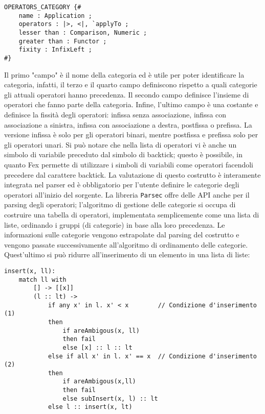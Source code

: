 \documentclass[10pt,a4paper]{article}
\begin{document}
\begin{lstlisting}
OPERATORS_CATEGORY {#
    name : Application ;
    operators : |>, <|, `applyTo ;
    lesser than : Comparison, Numeric ;
    greater than : Functor ;
    fixity : InfixLeft ;
#}
\end{lstlisting}

Il primo "campo" è il nome della categoria ed è utile per poter identificare la categoria, infatti, il terzo e il
quarto campo definiscono rispetto a quali categorie gli attuali operatori hanno precedenza. Il secondo campo definisce
l'insieme di operatori che fanno parte della categoria. Infine, l'ultimo campo è una costante e definisce la fissità
degli operatori: infissa senza associazione, infissa con associazione a sinistra, infissa con associazione a destra,
postfissa o prefissa. La versione infissa è solo per gli operatori binari, mentre postfissa e prefissa solo per gli
operatori unari. Si può notare che nella lista di operatori vi è anche un simbolo di variabile preceduto dal simbolo
di backtick; questo è possibile, in quanto Fex permette di utilizzare i simboli di variabili come operatori
facendoli precedere dal carattere backtick. La valutazione di questo costrutto è interamente integrata nel parser ed
è obbligatorio per l'utente definire le categorie degli operatori all'inizio del sorgente. La libreria \texttt{Parsec}
offre delle API anche per il parsing degli operatori; l'algoritmo di gestione delle categorie si occupa di costruire
una tabella di operatori, implementata semplicemente come una lista di liste, ordinando i gruppi (di categorie) in
base alla loro precedenza. Le informazioni sulle categorie vengono estrapolate dal parsing del costrutto e vengono
passate successivamente all'algoritmo di ordinamento delle categorie. Quest'ultimo si può ridurre all'inserimento
di un elemento in una lista di liste:

\begin{lstlisting}
insert(x, ll):
    match ll with
        [] -> [[x]]
        (l :: lt) ->
            if any x' in l. x' < x        // Condizione d'inserimento (1)
            then
                if areAmbigous(x, ll)
                then fail
                else [x] :: l :: lt
            else if all x' in l. x' == x  // Condizione d'inserimento (2)
            then
                if areAmbigous(x,ll)
                then fail
                else subInsert(x, l) :: lt
            else l :: insert(x, lt)
\end{lstlisting}
\end{document}
